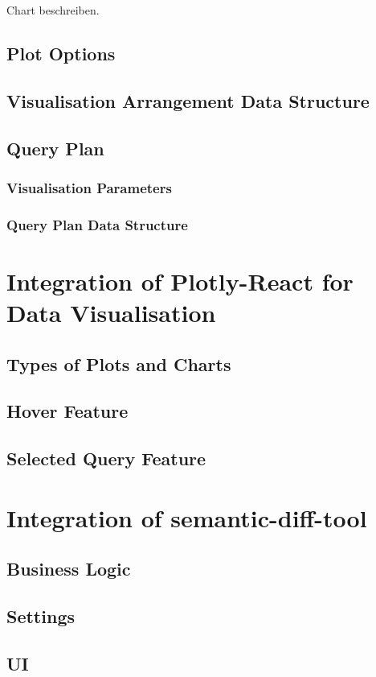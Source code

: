 Chart beschreiben.


\subsection{Plot Options}
\subsection{Visualisation Arrangement Data Structure}
\subsection{Query Plan}
\subsubsection{Visualisation Parameters}
\subsubsection{Query Plan Data Structure}

\section{Integration of Plotly-React for Data Visualisation}
\subsection{Types of Plots and Charts}
\subsection{Hover Feature}
\subsection{Selected Query Feature}

\section{Integration of semantic-diff-tool}\label{sec:semantic-diff-integration}
\subsection{Business Logic}
\subsection{Settings}
\subsection{UI}